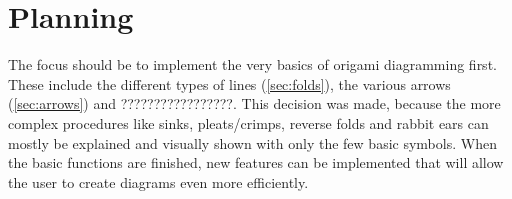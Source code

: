 
\section{Planning}
\label{planning}

The focus should be to implement the very basics of origami diagramming first. These include the different types of lines (\ref{sec:folds}), the various arrows (\ref{sec:arrows}) and ?????????????????. This decision was made, because the more complex procedures like sinks, pleats/crimps, reverse folds and rabbit ears can mostly be explained and visually shown with only the few basic symbols.
When the basic functions are finished, new features can be implemented that will allow the user to create diagrams even more efficiently.
